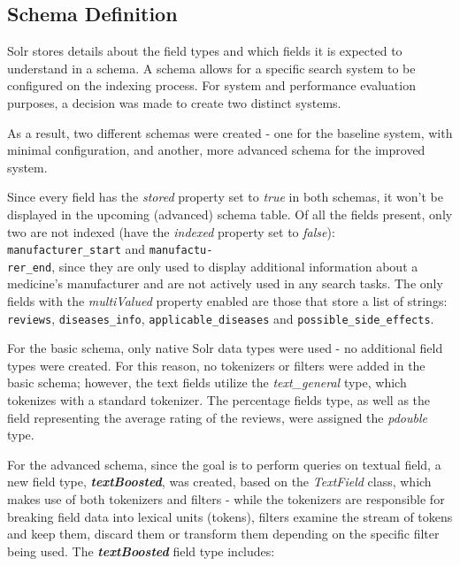 \documentclass[sigconf]{acmart}
\begin{document}
\subsection{Schema Definition}

Solr stores details about the field types and which fields it is expected to understand in a schema. A schema allows for a specific search system to be configured on the indexing process. For system and performance evaluation purposes, a decision was made to create two distinct systems.

As a result, two different schemas were created - one for the baseline system, with minimal configuration, and another, more advanced schema for the improved system. 

Since every field has the \textit{stored} property set to \textit{true} in both schemas, it won't be displayed in the upcoming (advanced) schema table. Of all the fields present, only two are not indexed (have the \textit{indexed} property set to \textit{false}): \texttt{manufacturer\_start} and \texttt{manufactu-\\rer\_end}, since they are only used to display additional information about a medicine's manufacturer and are not actively used in any search tasks. The only fields with the \textit{multiValued} property enabled are those that store a list of strings: \texttt{reviews}, \texttt{diseases\_info}, \texttt{applicable\_diseases} and \texttt{possible\_side\_effects}.

For the basic schema, only native Solr data types were used - no additional field types were created. For this reason, no tokenizers\cite{tokenizer} or filters\cite{filters} were added in the basic schema; however, the text fields utilize the \textit{text\_general} type, which tokenizes with a standard tokenizer. The percentage fields type, as well as the field representing the average rating of the reviews, were assigned the \textit{pdouble} type.

For the advanced schema, since the goal is to perform queries on textual field, a new field type, \textbf{\textit{textBoosted}}, was created, based on the \textit{TextField} class, which makes use of both tokenizers and filters - while the tokenizers are responsible for breaking field data into lexical units (tokens), filters examine the stream of tokens and keep them, discard them or transform them depending on the specific filter being used. The \textbf{\textit{textBoosted}} field type includes: 
\end{document}
